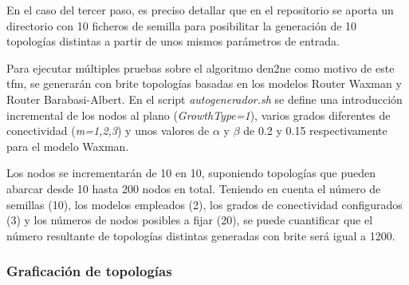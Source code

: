 En el caso del tercer paso, es preciso detallar que en el repositorio se aporta un directorio con 10 ficheros de semilla para posibilitar la generación de 10 topologías distintas a partir de unos mismos parámetros de entrada. 

\vspace{3mm}

Para ejecutar múltiples pruebas sobre el algoritmo \gls{den2ne} como motivo de este \gls{tfm}, se generarán con \gls{brite} topologías basadas en los modelos Router Waxman y Router Barabasi-Albert. En el script \textit{autogenerador.sh} se define una introducción incremental de los nodos al plano (\textit{GrowthType=1}), varios grados diferentes de conectividad (\textit{m=1,2,3}) y unos valores de $\alpha$ y $\beta$ de 0.2 y 0.15 respectivamente para el modelo Waxman.

\vspace{3mm}

Los nodos se incrementarán de 10 en 10, suponiendo topologías que pueden abarcar desde 10 hasta 200 nodos en total. Teniendo en cuenta el número de semillas (10), los modelos empleados (2), los grados de conectividad configurados (3) y los números de nodos posibles a fijar (20), se puede cuantificar que el número resultante de topologías distintas generadas con \gls{brite} será igual a 1200.

\vspace{3mm}

\subsubsection{Graficación de topologías}

